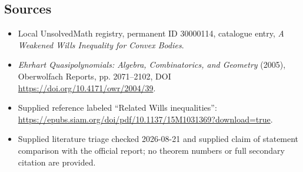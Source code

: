 \documentclass[11pt]{article}
\begin{document}
\subsection{Sources}
\begin{itemize}
\item Local UnsolvedMath registry, permanent ID 30000114, catalogue entry, \emph{A Weakened Wills Inequality for Convex Bodies}.
\item \emph{Ehrhart Quasipolynomials: Algebra, Combinatorics, and Geometry} (2005), Oberwolfach Reports, pp. 2071--2102, DOI \url{https://doi.org/10.4171/owr/2004/39}.
\item Supplied reference labeled ``Related Wills inequalities'': \url{https://epubs.siam.org/doi/pdf/10.1137/15M1031369?download=true}.
\item Supplied literature triage checked 2026-08-21 and supplied claim of statement comparison with the official report; no theorem numbers or full secondary citation are provided.
\end{itemize}
\end{document}
